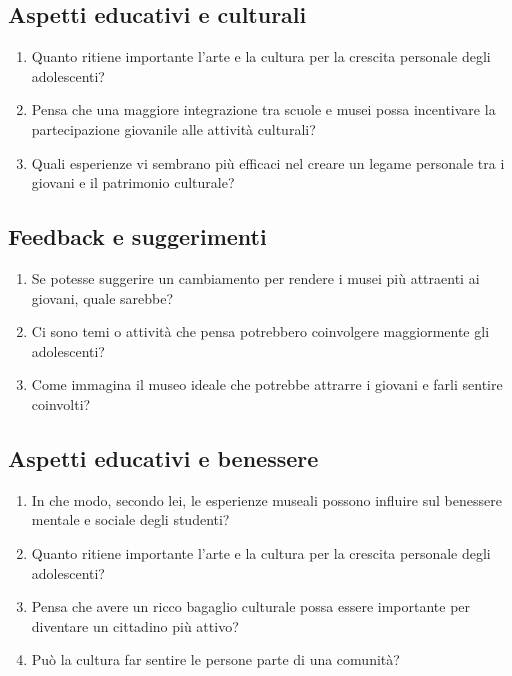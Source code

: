 \documentclass[a4paper, 12pt]{article}
\begin{document}
\subsection{\textcolor{subsectioncolor}{Aspetti educativi e culturali}}

\begin{enumerate}
    \item Quanto ritiene importante l'arte e la cultura per la crescita personale degli adolescenti?
    \item Pensa che una maggiore integrazione tra scuole e musei possa incentivare la partecipazione giovanile alle attività culturali?
    \item Quali esperienze vi sembrano più efficaci nel creare un legame personale tra i giovani e il patrimonio culturale?
\end{enumerate}

\subsection{\textcolor{subsectioncolor}{Feedback e suggerimenti}}

\begin{enumerate}
    \item Se potesse suggerire un cambiamento per rendere i musei più attraenti ai giovani, quale sarebbe?
    \item Ci sono temi o attività che pensa potrebbero coinvolgere maggiormente gli adolescenti?
    \item Come immagina il museo ideale che potrebbe attrarre i giovani e farli sentire coinvolti?
\end{enumerate}

\subsection{\textcolor{subsectioncolor}{Aspetti educativi e benessere}}

\begin{enumerate}
    \item In che modo, secondo lei, le esperienze museali possono influire sul benessere mentale e sociale degli studenti?
    \item Quanto ritiene importante l'arte e la cultura per la crescita personale degli adolescenti?
    \item Pensa che avere un ricco bagaglio culturale possa essere importante per diventare un cittadino più attivo?
    \item Può la cultura far sentire le persone parte di una comunità?
\end{enumerate}
\end{document}
